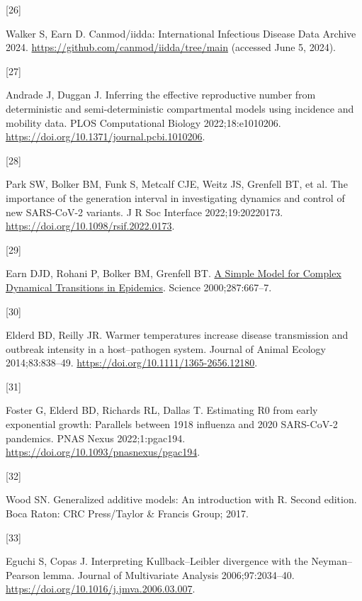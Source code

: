 \documentclass[
11pt, %
oneside, %
english, %
singlespacing, %
]{macthesis} %
\newlength{\cslhangindent}
\newlength{\csllabelwidth}
\newenvironment{CSLReferences}[2] %
{\begin{list}{}{%
	\setlength{\itemindent}{0pt}
	\setlength{\leftmargin}{0pt}
	\setlength{\parsep}{0pt}
	\ifodd #1
	\setlength{\leftmargin}{\cslhangindent}
	\setlength{\itemindent}{-1\cslhangindent}
	\fi
	\setlength{\itemsep}{#2\baselineskip}}}
{\end{list}}
\newcommand{\CSLLeftMargin}[1]{\parbox[t]{\csllabelwidth}{\strut#1\strut}}
\newcommand{\CSLRightInline}[1]{\parbox[t]{\linewidth - \csllabelwidth}{\strut#1\strut}}
\begin{document}
\begin{CSLReferences}{0}{0}
\CSLLeftMargin{{[}26{]} }%
\CSLRightInline{Walker S, Earn D. Canmod/iidda: {International Infectious Disease Data Archive} 2024. \url{https://github.com/canmod/iidda/tree/main} (accessed June 5, 2024).}

\CSLLeftMargin{{[}27{]} }%
\CSLRightInline{Andrade J, Duggan J. Inferring the effective reproductive number from deterministic and semi-deterministic compartmental models using incidence and mobility data. PLOS Computational Biology 2022;18:e1010206. \url{https://doi.org/10.1371/journal.pcbi.1010206}.}

\CSLLeftMargin{{[}28{]} }%
\CSLRightInline{Park SW, Bolker BM, Funk S, Metcalf CJE, Weitz JS, Grenfell BT, et al. The importance of the generation interval in investigating dynamics and control of new {SARS-CoV-2} variants. J R Soc Interface 2022;19:20220173. \url{https://doi.org/10.1098/rsif.2022.0173}.}

\CSLLeftMargin{{[}29{]} }%
\CSLRightInline{Earn DJD, Rohani P, Bolker BM, Grenfell BT. \href{https://go-gale-com.libaccess.lib.mcmaster.ca/ps/i.do?p=AONE&sw=w&issn=00368075&v=2.1&it=r&id=GALE\%7CA59410262&sid=googleScholar&linkaccess=abs}{A {Simple Model} for {Complex Dynamical Transitions} in {Epidemics}}. Science 2000;287:667--7.}

\CSLLeftMargin{{[}30{]} }%
\CSLRightInline{Elderd BD, Reilly JR. Warmer temperatures increase disease transmission and outbreak intensity in a host--pathogen system. Journal of Animal Ecology 2014;83:838--49. \url{https://doi.org/10.1111/1365-2656.12180}.}

\CSLLeftMargin{{[}31{]} }%
\CSLRightInline{Foster G, Elderd BD, Richards RL, Dallas T. Estimating {R0} from early exponential growth: Parallels between 1918 influenza and 2020 {SARS-CoV-2} pandemics. PNAS Nexus 2022;1:pgac194. \url{https://doi.org/10.1093/pnasnexus/pgac194}.}

\CSLLeftMargin{{[}32{]} }%
\CSLRightInline{Wood SN. Generalized additive models: An introduction with {R}. Second edition. Boca Raton: CRC Press/Taylor \& Francis Group; 2017.}

\CSLLeftMargin{{[}33{]} }%
\CSLRightInline{Eguchi S, Copas J. Interpreting {Kullback}--{Leibler} divergence with the {Neyman}--{Pearson} lemma. Journal of Multivariate Analysis 2006;97:2034--40. \url{https://doi.org/10.1016/j.jmva.2006.03.007}.}

\end{CSLReferences}
\end{document}
